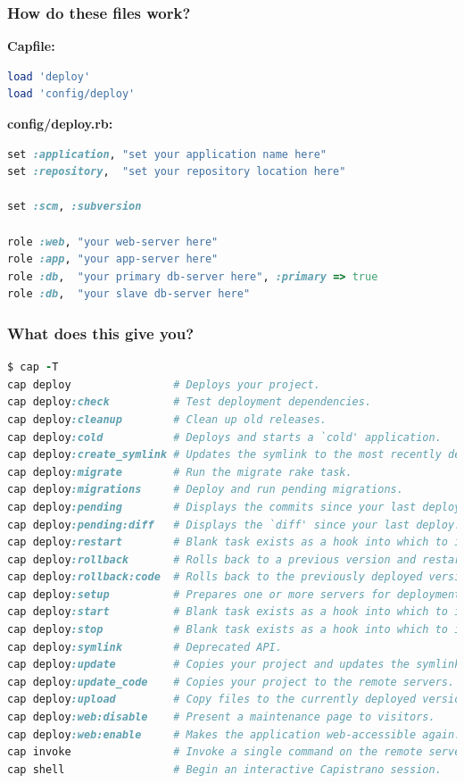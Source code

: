 \documentclass[t,handout]{beamer}
\begin{document}
\begin{frame}[fragile]
\frametitle{How do these files work?}
{\bf Capfile:}\\
\begin{lstlisting}[frame=none,language=Ruby,basicstyle=\scriptsize\ttfamily\color{black},]
load 'deploy'
load 'config/deploy'
\end{lstlisting}
{\bf config/deploy.rb:}
\begin{lstlisting}[frame=none,language=Ruby,basicstyle=\scriptsize\ttfamily\color{black},]
set :application, "set your application name here"
set :repository,  "set your repository location here"

set :scm, :subversion

role :web, "your web-server here"
role :app, "your app-server here"
role :db,  "your primary db-server here", :primary => true 
role :db,  "your slave db-server here"
\end{lstlisting}
\end{frame}

\begin{frame}[fragile]
\frametitle{What does this give you?}
\begin{lstlisting}[frame=none,language=Ruby,basicstyle=\tiny\ttfamily\color{black},commentstyle=\tiny\ttfamily\color{red}]
$ cap -T
cap deploy                # Deploys your project.
cap deploy:check          # Test deployment dependencies.
cap deploy:cleanup        # Clean up old releases.
cap deploy:cold           # Deploys and starts a `cold' application.
cap deploy:create_symlink # Updates the symlink to the most recently deployed...
cap deploy:migrate        # Run the migrate rake task.
cap deploy:migrations     # Deploy and run pending migrations.
cap deploy:pending        # Displays the commits since your last deploy.
cap deploy:pending:diff   # Displays the `diff' since your last deploy.
cap deploy:restart        # Blank task exists as a hook into which to install...
cap deploy:rollback       # Rolls back to a previous version and restarts.
cap deploy:rollback:code  # Rolls back to the previously deployed version.
cap deploy:setup          # Prepares one or more servers for deployment.
cap deploy:start          # Blank task exists as a hook into which to install...
cap deploy:stop           # Blank task exists as a hook into which to install...
cap deploy:symlink        # Deprecated API.
cap deploy:update         # Copies your project and updates the symlink.
cap deploy:update_code    # Copies your project to the remote servers.
cap deploy:upload         # Copy files to the currently deployed version.
cap deploy:web:disable    # Present a maintenance page to visitors.
cap deploy:web:enable     # Makes the application web-accessible again.
cap invoke                # Invoke a single command on the remote servers.
cap shell                 # Begin an interactive Capistrano session.
\end{lstlisting}
\end{frame}
\end{document}
